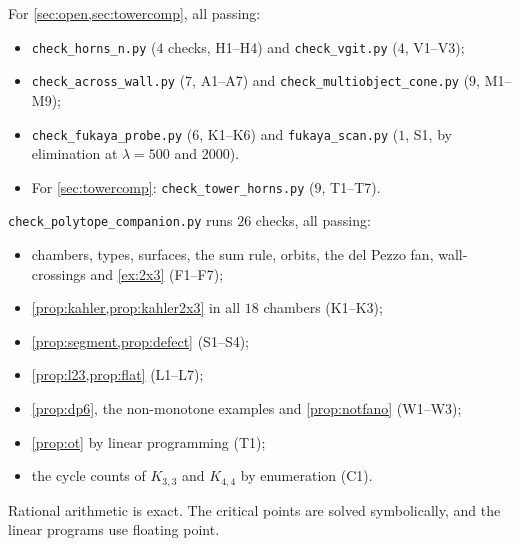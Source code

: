 \documentclass[11pt]{article}
\theoremstyle{definition}
\theoremstyle{remark}
\begin{document}
For \cref{sec:open,sec:towercomp}, all passing:
\begin{itemize}[leftmargin=*]
\item \texttt{check\_horns\_n.py} ($4$ checks, H1--H4) and \texttt{check\_vgit.py} ($4$, V1--V3);
\item \texttt{check\_across\_wall.py} ($7$, A1--A7) and \texttt{check\_multiobject\_cone.py} ($9$, M1--M9);
\item \texttt{check\_fukaya\_probe.py} ($6$, K1--K6) and \texttt{fukaya\_scan.py} ($1$, S1, by elimination at $\lambda=500$
  and $2000$).
\item For \cref{sec:towercomp}: \texttt{check\_tower\_horns.py} ($9$, T1--T7).
\end{itemize}

\texttt{check\_polytope\_companion.py} runs $26$ checks, all passing:
\begin{itemize}[leftmargin=*]
\item chambers, types, surfaces, the sum rule, orbits, the del Pezzo fan, wall-crossings and
  \cref{ex:2x3} (F1--F7);
\item \cref{prop:kahler,prop:kahler2x3} in all $18$ chambers (K1--K3);
\item \cref{prop:segment,prop:defect} (S1--S4);
\item \cref{prop:l23,prop:flat} (L1--L7);
\item \cref{prop:dp6}, the non-monotone examples and \cref{prop:notfano} (W1--W3);
\item \cref{prop:ot} by linear programming (T1);
\item the cycle counts of $K_{3,3}$ and $K_{4,4}$ by enumeration (C1).
\end{itemize}
Rational arithmetic is exact. The critical points are solved symbolically, and the linear programs use
floating point.
\end{document}
